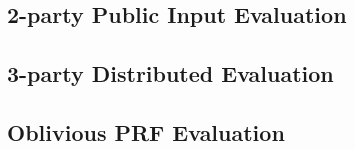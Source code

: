 








\subsection{2-party Public Input Evaluation}

\subsection{3-party Distributed Evaluation}

\subsection{Oblivious PRF Evaluation}
